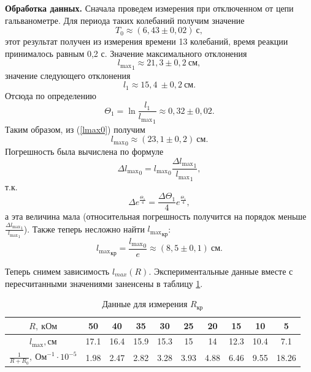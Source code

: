 \documentclass[12pt,a4paper]{article}
\begin{document}
\textbf{Обработка данных.} Сначала проведем измерения при отключенном от цепи гальванометре. Для периода таких колебаний получим значение
\begin{equation}
T_0 \approx (6,43 \pm 0,02)~\text{с},
\end{equation}
этот результат получен из измерения времени 13 колебаний, время реакции принималось равным 0,2 с. Значение максимального отклонения 
\begin{equation}
{l_\text{max}}_1 \approx 21,3\pm0,2~\text{см},
\end{equation}
значение следующего отклонения
\begin{equation} 
l_1 \approx 15,4~\pm0,2~\text{см}.
\end{equation}
Отсюда по определению
\begin{equation}
\Theta_1 = \ln\frac{l_1}{{l_\text{max}}_1} \approx 0,32\pm0,02.
\end{equation}
Таким образом, из (\ref{lmax0}) получим
\begin{equation}
{l_\text{max}}_0 \approx (23,1\pm0,2)~\text{см}.\label{lmax0val}
\end{equation}
Погрешность была вычислена по формуле
\begin{equation}
\Delta {l_\text{max}}_0 = {l_\text{max}}_0\frac{\Delta {l_\text{max}}_1}{{l_\text{max}}_1},
\end{equation}
т.к.
\begin{equation}
\Delta e^{\frac{\Theta_1}{4}} = \frac{\Delta\Theta_1}{4}e^{\frac{\Theta_1}{4}},
\end{equation}
а эта величина мала (относительная погрешность получится на порядок меньше $\frac{\Delta {l_\text{max}}_1}{{l_\text{max}}_1}$). Также теперь несложно найти ${l_\text{max}}_\text{кр}$:
\begin{equation}
{l_\text{max}}_\text{кр} = \frac{{l_\text{max}}_0}{e} \approx (8,5\pm0,1)~\text{см}. 
\end{equation}

Теперь снимем зависимость $l_{max}(R)$. Экспериментальные данные вместе с пересчитанными значениями заненсены в таблицу \ref{tab3}.
\begin{table}[ht]\centering
\begin{tabular}{|*{10}{c|}}
\hline
$R,~\text{кОм}$&50&40&35&30&25&20&15&10&5\\
\hline
$l_\text{max},\text{см}$&17.1&16.4&15.9&15.3&15&14&12.3&10.4&7.1\\
\hline
$\frac{1}{R + R_0},~\text{Ом}^{-1}\cdot10^{-5}$&1.98&2.47&2.82&3.28&3.93&4.88&6.46&9.55&18.26\\
\hline
\end{tabular}
\caption{Данные для измерения $R_\text{кр}$ \label{tab3}}
\end{table}
\end{document}

